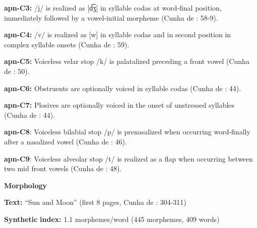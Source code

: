 \begin{styleBody}
\textbf{apn-C3:} /j/ is realized as [d͡ʒ] in syllable codas at word-final position, immediately followed by a vowel-initial morpheme (Cunha de \citealt{Oliveira2005}: 58-9).
\end{styleBody}

\begin{styleBody}
\textbf{apn-C4:} /v/ is realized as [w] in syllable codas and in second position in complex syllable onsets (Cunha de \citealt{Oliveira2005}: 59).
\end{styleBody}

\begin{styleBody}
\textbf{apn-C5:} Voiceless velar stop /k/ is palatalized preceding a front vowel (Cunha de \citealt{Oliveira2005}: 50).
\end{styleBody}

\begin{styleBody}
\textbf{apn-C6:} Obstruents are optionally voiced in syllable codas (Cunha de \citealt{Oliveira2005}: 44).
\end{styleBody}

\begin{styleBody}
\textbf{apn-C7:} Plosives are optionally voiced in the onset of unstressed syllables (Cunha de \citealt{Oliveira2005}: 44).
\end{styleBody}

\begin{styleBody}
\textbf{apn-C8}: Voiceless bilabial stop /p/ is prenasalized when occurring word-finally after a nasalized vowel (Cunha de \citealt{Oliveira2005}: 46).
\end{styleBody}

\begin{styleBody}
\textbf{apn-C9}: Voiceless alveolar stop /t/ is realized as a flap when occurring between two mid front vowels (Cunha de \citealt{Oliveira2005}: 48).
\end{styleBody}

\begin{styleBody}
\textbf{Morphology}
\end{styleBody}

\begin{styleBody}
\textbf{Text:} “Sun and Moon” (first 8 pages, Cunha de \citealt{Oliveira2005}: 304-311)
\end{styleBody}

\begin{styleBody}
\textbf{Synthetic} \textbf{index:} 1.1 morphemes/word (445 morphemes, 409 words)
\end{styleBody}

